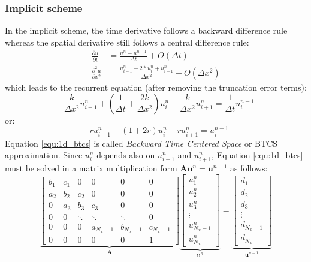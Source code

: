 \subsubsection{Implicit scheme}
In the implicit scheme, the time derivative follows a backward difference rule whereas the spatial derivative still follows a central difference rule:
\begin{align}
	\frac{\partial u}{\partial t} &= \frac{u^{n} - u^{n-1}}{\Delta t} + O(\Delta t) \\
	\frac{\partial^2 u}{\partial x^2} &= \frac{u^{n}_{i-1} - 2*u^{n}_{i} + u^{n}_{i+1}}{\Delta x^2} + O(\Delta x^2)	
\end{align}
which leads to the recurrent equation (after removing the truncation error terms):
\begin{equation}
	-\frac{k}{\Delta x^2} u^{n}_{i-1} + \left( \frac{1}{\Delta t} + \frac{2k}{\Delta x^2} \right) u^{n}_{i} - \frac{k}{\Delta x^2} u^{n}_{i+1} = \frac{1}{\Delta t} u^{n-1}_{i}
	\nonumber
\end{equation}
or:
\begin{equation}
	-r u^{n}_{i-1} + \left( 1 + 2r \right) u^{n}_{i} - r u^{n}_{i+1} = u^{n-1}_{i}
	\label{equ:1d_btcs}
\end{equation}
Equation \ref{equ:1d_btcs} is called \textit{Backward Time Centered Space} or BTCS approximation. Since $u^{n}_{i}$ depends also on $u^{n}_{i-1}$ and $u^{n}_{i+1}$, Equation \ref{equ:1d_btcs} must be solved in a matrix multiplication form $\mathbf{A} \mathbf{u}^{n} = \mathbf{u}^{n-1}$ as follows:
\begin{equation}
\underbrace{
\begin{bmatrix}
	b_1 & c_1 & 0      & 0         & 0         & 0         \\
	a_2 & b_2 & c_2    & 0         & 0         & 0         \\
	0   & a_3 & b_3    & c_3       & 0         & 0         \\
	0   & 0   & \ddots & \ddots    & \ddots    & 0         \\
	0   & 0   & 0      & a_{N_x-1} & b_{N_x-1} & c_{N_x-1} \\
	0   & 0   & 0      & 0         & 0         & 1
\end{bmatrix}}_{\mathbf{A}} 
\underbrace{
\begin{bmatrix}
	u^n_1       \\
	u^n_2       \\
	u^n_3       \\
	\vdots      \\
	u^n_{N_x-1} \\
	u^n_{N_x}   
\end{bmatrix}}_{\mathbf{u}^{n}} = 
\underbrace{
\begin{bmatrix}
	d_1       \\
	d_2       \\
	d_3       \\
	\vdots    \\
	d_{N_x-1} \\
	d_{N_x}   
\end{bmatrix}}_{\mathbf{u}^{n-1}}
\label{equ:1d_btcs_matrix}
\end{equation}
